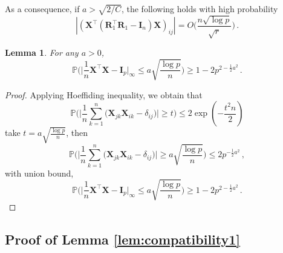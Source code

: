 \documentclass[11pt]{article}
\newtheorem{lemma}{Lemma}%
\newcommand{\bX}{\boldsymbol{X}}
\newcommand{\bI}{\boldsymbol{I}}
\newcommand{\bR}{\boldsymbol{R}}
\newcommand{\Prob}{\mathbb{P}}
\begin{document}
As a consequence, if $a>\sqrt{2/C}$, the following holds with high probability
\begin{equation}\label{eq:boundXRX}
    |(\bX^\top(\bR_1^\top \bR_1-\bI_n)\bX)_{ij}| = O\bigg(\frac{n\sqrt{\log p}}{\sqrt{r}}\bigg)\,.
\end{equation}
\begin{lemma}\label{lemma:boundX}
    For any $a>0$,
    \begin{equation*}
        \Prob\bigg(\bigg|\frac{1}{n }\bX^\top \bX-\bI_p\bigg|_\infty\leq a\sqrt{\frac{\log p}{  n}}\bigg)\geq 1- 2p^{2-\frac{1}{2} a^2}\,.
    \end{equation*}
\end{lemma}
\begin{proof}
Applying Hoeffiding inequality, we obtain that 
\[
\Prob\bigg(\bigg|\frac{1}{n}\sum_{k=1}^n\bigg(\bX_{jk}\bX_{ik}-\delta_{ij}\bigg)\bigg|\geq t\bigg)\leq 2\exp\left(-\frac{t^2n }{2}\right)
\]
take $t = a\sqrt{\frac{\log p}{  n}}$, then
\[\Prob\bigg(\bigg|\frac{1}{n}\sum_{k=1}^n\bigg(\bX_{jk}\bX_{ik}-\delta_{ij}\bigg)\bigg|\geq a\sqrt{\frac{\log p}{  n}}\bigg)\leq 2p^{-\frac{1}{2} a^2}\,,\]
with union bound,
\[    \Prob\bigg(\bigg|\frac{1}{n }\bX^\top \bX-\bI_p\bigg|_\infty\leq a\sqrt{\frac{\log p}{  n}}\bigg)\geq 1- 2p^{2-\frac{1}{2} a^2}\,.
\]
\end{proof}
\subsection{Proof of Lemma \ref{lem:compatibility1}}\label{pf:compatibility1}
\end{document}
